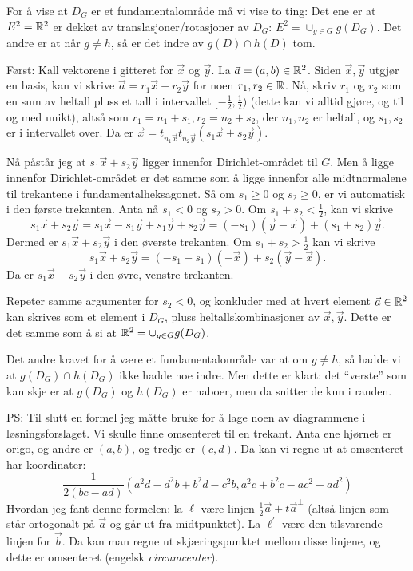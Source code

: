 \documentclass[11pt, norsk]{article}
\begin{document}
\begin{losn}
For å vise at $D_G$ er et fundamentalområde må vi vise to ting: Det ene er at $E^2=\mathbb{R}^2$ er dekket av translasjoner/rotasjoner av $D_G$: $E^2 = \cup_{g \in G} g(D_G)$. Det andre er at når $g \neq h$, så er det indre av $g(D) \cap h(D)$ tom.

Først: Kall vektorene i gitteret for $\vec x$ og $\vec y$. La $\vec a = (a,b) \in \mathbb{R}^2$. Siden $\vec x,\vec y$ utgjør en basis, kan vi skrive $\vec a = r_1 \vec x + r_2 \vec y$ for noen $r_1,r_2 \in \mathbb{R}$. Nå, skriv $r_1$ og $r_2$ som en sum av heltall pluss et tall i intervallet $[-\frac 12,\frac 12)$ (dette kan vi alltid gjøre, og til og med unikt), altså som $r_1=n_1 + s_1, r_2=n_2+s_2$, der $n_1,n_2$ er heltall, og $s_1,s_2$ er i intervallet over. Da er $\vec x = t_{n_1 \vec x}t_{n_2 \vec y}(s_1 \vec x + s_2 \vec y)$.

Nå påstår jeg at $s_1 \vec x + s_2 \vec y$ ligger innenfor Dirichlet-området til $G$. Men å ligge innenfor Dirichlet-området er det samme som å ligge innenfor alle midtnormalene til trekantene i fundamentalheksagonet. Så om $s_1 \geq 0$ og $s_2 \geq 0$, er vi automatisk i den første trekanten. Anta nå $s_1 < 0$ og $s_2 > 0$. Om $s_1+s_2 < \frac 12$, kan vi skrive
\[
s_1 \vec x + s_2 \vec y = s_1 \vec x -s_1 \vec y +s_1 \vec y + s_2 \vec y = (-s_1)(\vec y - \vec x) + (s_1+s_2) \vec y.
\]
Dermed er $s_1 \vec x + s_2 \vec y$ i den øverste trekanten. Om $s_1 + s_2 > \frac 12$ kan vi skrive
\[
s_1 \vec x + s_2 \vec y = (-s_1-s_1)(-\vec x) + s_2(\vec y- \vec x).
\]
Da er $s_1 \vec x + s_2 \vec y$ i den øvre, venstre trekanten.

Repeter samme argumenter for $s_2 < 0$, og konkluder med at hvert element $\vec a \in \mathbb{R}^2$ kan skrives som et element i $D_G$, pluss heltallskombinasjoner av $\vec x,\vec y$. Dette er det samme som å si at $\mathbb{R}^2 = \cup_{g \in G} g(D_G)$.

Det andre kravet for å være et fundamentalområde var at om $g \neq h$, så hadde vi at $g(D_G) \cap h(D_G)$ ikke hadde noe indre. Men dette er klart: det ``verste'' som kan skje er at $g(D_G)$ og $h(D_G)$ er naboer, men da snitter de kun i randen.
\end{losn}

PS: Til slutt en formel jeg måtte bruke for å lage noen av diagrammene i løsningsforslaget. Vi skulle finne omsenteret til en trekant. Anta ene hjørnet er origo, og andre er $(a,b)$, og tredje er $(c,d)$. Da kan vi regne ut at omsenteret har koordinater:
\[
\frac{1}{2(bc-ad)} \left( a^2d-d^2b+b^2d-c^2b, a^2c + b^2c - ac^2- ad^2 \right)
\]
Hvordan jeg fant denne formelen: la $\ell$ være linjen $\frac 12 \vec a + t \vec a^\perp$ (altså linjen som står ortogonalt på $\vec a$ og går ut fra midtpunktet). La $\ell^\prime$ være den tilsvarende linjen for $\vec b$. Da kan man regne ut skjæringspunktet mellom disse linjene, og dette er omsenteret (engelsk \emph{circumcenter}).
\end{document}
